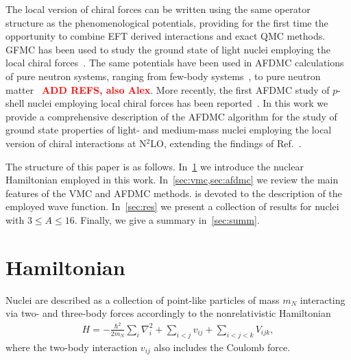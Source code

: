 \documentclass[aps,prc,twocolumn,superscriptaddress,floatfix]{revtex4-1}
\newcommand{\red}[1]{\protect\textcolor{red}{#1}}
\begin{document}
The local version of chiral forces can be written using the same operator
structure as the phenomenological potentials, providing for the first time
the opportunity to combine EFT derived interactions and exact QMC methods.
GFMC has been used to study the ground state of light nuclei employing 
the local chiral forces~\cite{Gezerlis:2013,Gezerlis:2014,Tews:2016,Lynn:2016,Lynn:2017}.
The same potentials have been used in AFDMC calculations of pure neutron systems, 
ranging from few-body systems~\cite{Lynn:2014,Klos:2016,Zhao:2016,Gandolfi:2017}, to pure
neutron matter~\cite{Gezerlis:2013,Gezerlis:2014,Tews:2016}
\red{\bf ADD REFS, also Alex}.
More recently, the first AFDMC study of $p$-shell nuclei employing local
chiral forces has been reported~\cite{Lonardoni:2017afdmc}.
In this work we provide a comprehensive description of the AFDMC algorithm 
for the study of ground state properties of light- and medium-mass nuclei 
employing the local version of chiral interactions at N$^2$LO, extending
the findings of Ref.~\cite{Lonardoni:2017afdmc}.

The structure of this paper is as follows. 
In~\cref{sec:ham} we introduce the nuclear Hamiltonian employed in this work.
In~\cref{sec:vmc,sec:afdmc} we review the main features of the VMC and AFDMC methods.
 is devoted to the description of the employed wave function. 
In~\cref{sec:res} we present a collection of results for nuclei
with $3\le A\le 16$. 
Finally, we give a summary in~\cref{sec:summ}.


\section{Hamiltonian}
\label{sec:ham}
Nuclei are described as a collection of point-like particles of mass $m_N$ interacting 
via two- and three-body forces accordingly to the nonrelativistic Hamiltonian
\begin{align}
	H=-\frac{\hbar^2}{2m_N}\sum_i \nabla_i^2+\sum_{i<j}v_{ij}+\sum_{i<j<k}V_{ijk} ,
\end{align}
where the two-body interaction $v_{ij}$ also includes the Coulomb force.
\end{document}
